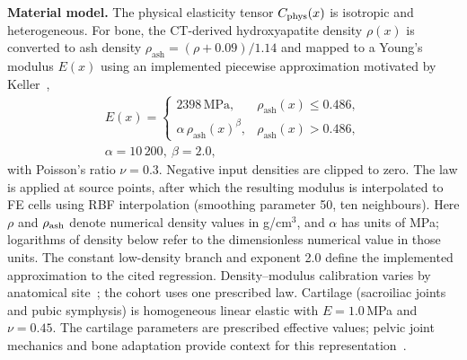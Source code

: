 \documentclass[pdflatex,sn-basic]{sn-jnl}
\begin{document}
\noindent\textbf{Material model.}
The physical elasticity tensor $C_{\rm phys}(x)$ is isotropic and heterogeneous.
For bone, the CT-derived hydroxyapatite density $\rho(x)$ is converted to ash density $\rho_{\mathrm{ash}}=(\rho+0.09)/1.14$ and mapped to a Young's modulus $E(x)$ using an implemented piecewise approximation motivated by Keller~\citep{Keller1994},
\begin{equation}
\begin{gathered}
E(x)=\begin{cases}
2398\,\mathrm{MPa}, & \rho_{\mathrm{ash}}(x)\le 0.486,\\[2pt]
\alpha\,\rho_{\mathrm{ash}}(x)^{\beta}, & \rho_{\mathrm{ash}}(x)>0.486,
\end{cases}
\\
 \alpha=10\,200,\ \beta=2.0,
\label{eq:keller}
\end{gathered}
\end{equation}
with Poisson's ratio $\nu=0.3$. Negative input densities are clipped to zero. The law is applied at source points, after which the resulting modulus is interpolated to FE cells using RBF interpolation (smoothing parameter 50, ten neighbours). Here $\rho$ and $\rho_{\rm ash}$ denote numerical density values in g/cm$^3$, and $\alpha$ has units of MPa; logarithms of density below refer to the dimensionless numerical value in those units. The constant low-density branch and exponent 2.0 define the implemented approximation to the cited regression. Density--modulus calibration varies by anatomical site~\citep{Morgan2003Trabecular}; the cohort uses one prescribed law.
Cartilage (sacroiliac joints and pubic symphysis) is homogeneous linear elastic with $E=1.0$\,MPa and $\nu=0.45$.
The cartilage parameters are prescribed effective values; pelvic joint mechanics and bone adaptation provide context for this representation~\citep{Frost1987,Huiskes1987,Snijders1993,Vleeming2012,Goode2008}.
\end{document}
